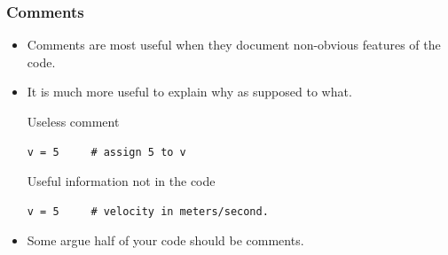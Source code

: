 \documentclass{beamer}
\begin{document}
\begin{frame}[fragile]
\frametitle{Comments}
\begin{itemize}
\item Comments are most useful when they document \alert{non-obvious} features of
the code. 
\item It is much more useful to explain \alert{why} as supposed to \alert{what}.

\begin{block}{Useless comment}
\small
\begin{verbatim}
v = 5     # assign 5 to v
\end{verbatim}
\end{block}
%
\pause
\begin{block}{Useful information not in the code}
\small
\begin{verbatim}
v = 5     # velocity in meters/second. 
\end{verbatim}
\end{block}
\item Some argue \alert{half} of your code should be comments.
\end{itemize}
\end{frame}
%
%
%
\end{document}
